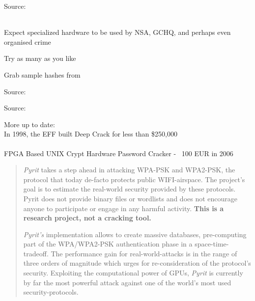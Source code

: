 \documentclass[20pt,landscape,a4paper,footrule]{foils}
\begin{document}
Source:\\
\\





Expect specialized hardware to be used by NSA, GCHQ, and perhaps even organised crime





Try as many as you like

Grab sample hashes from\\




Source:




Source: 

More up to date:\\
In 1998, the EFF built Deep Crack for less than \$250,000\\
\\
FPGA Based UNIX Crypt Hardware Password Cracker - ~100 EUR in 2006\\


\begin{quote}
\emph{Pyrit} takes a step ahead in attacking WPA-PSK and WPA2-PSK, the protocol that today de-facto protects public WIFI-airspace. The project's goal is to estimate the real-world security provided by these protocols. Pyrit does not provide binary files or wordlists and does not encourage anyone to participate or engage in any harmful activity. {\bf This is a research project, not a cracking tool.}

\emph{Pyrit's} implementation allows to create massive databases, pre-computing part of the WPA/WPA2-PSK authentication phase in a space-time-tradeoff. The performance gain for real-world-attacks is in the range of three orders of magnitude which urges for re-consideration of the protocol's security. Exploiting the computational power of GPUs, \emph{Pyrit} is currently by far the most powerful attack against one of the world's most used security-protocols.
\end{quote}
\end{document}
